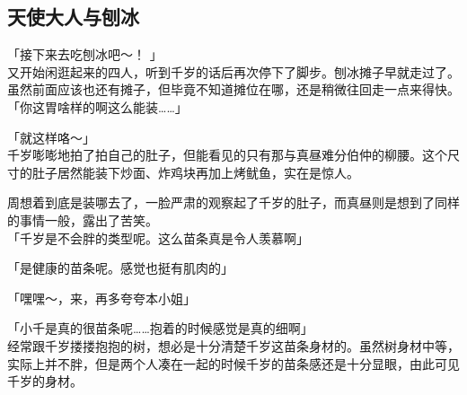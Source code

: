\subsection{天使大人与刨冰}

「接下来去吃刨冰吧～！ 」\\

又开始闲逛起来的四人，听到千岁的话后再次停下了脚步。刨冰摊子早就走过了。虽然前面应该也还有摊子，但毕竟不知道摊位在哪，还是稍微往回走一点来得快。\\

「你这胃啥样的啊这么能装……」

「就这样咯～」\\

千岁嘭嘭地拍了拍自己的肚子，但能看见的只有那与真昼难分伯仲的柳腰。这个尺寸的肚子居然能装下炒面、炸鸡块再加上烤鱿鱼，实在是惊人。

周想着到底是装哪去了，一脸严肃的观察起了千岁的肚子，而真昼则是想到了同样的事情一般，露出了苦笑。\\

「千岁是不会胖的类型呢。这么苗条真是令人羡慕啊」

「是健康的苗条呢。感觉也挺有肌肉的」

「嘿嘿～，来，再多夸夸本小姐」

「小千是真的很苗条呢……抱着的时候感觉是真的细啊」\\

经常跟千岁搂搂抱抱的树，想必是十分清楚千岁这苗条身材的。虽然树身材中等，实际上并不胖，但是两个人凑在一起的时候千岁的苗条感还是十分显眼，由此可见千岁的身材。

